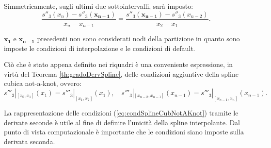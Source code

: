 \addtocounter{footnote}{-3}




Simmetricamente, sugli ultimi due sottointervalli, sarà imposto:
\begin{equation*}
    \boxed{\frac{s''_3(x_n)-s''_3(\boldsymbol{x_{n-1}})}{x_n-x_{n-1}}=\frac{s''_3(\boldsymbol{x_{n-1}})-s''_3(x_{n-2})}{x_2-x_1}.}
\end{equation*}

$\boldsymbol{x_1}$ e $\boldsymbol{x_{n-1}}$ precedenti non sono considerati nodi della partizione in quanto sono imposte le condizioni di interpolazione e le condizioni di default.

Ciò che è stato appena definito nei riquadri è una conveniente espressione, in virtù del Teorema \ref{th:gradoDervSpline}, delle condizioni aggiuntive della spline cubica not-a-knot, ovvero:
\begin{equation}\label{eq:condSplineCubNotAKnot}
    s'''_3|_{[x_0,x_1]}(x_1)=s'''_3|_{[x_1,x_2]}(x_1),\quad s'''_3|_{[x_{n-2},x_{n-1}]}(x_{n-1})=s'''_3|_{[x_{n-1},x_n]}(x_{n-1}).
\end{equation}

La rappresentazione delle condizioni (\ref{eq:condSplineCubNotAKnot}) tramite le derivate seconde è utile al fine di definire l'unicità della spline interpolante. Dal punto di vista computazionale è importante che le condizioni siano imposte sulla derivata seconda.

